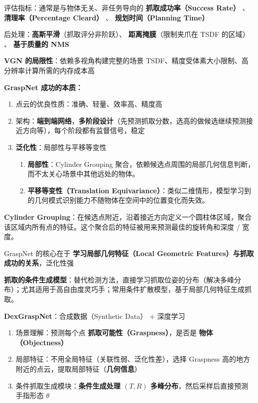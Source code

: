 \documentclass[
  8pt]{extarticle}
\providecommand{\tightlist}{%
  \setlength{\itemsep}{0pt}\setlength{\parskip}{0pt}}
\begin{document}
\begin{multicols*}{4}
评估指标：通常是与物体无关、非任务导向的 \textbf{抓取成功率（Success
Rate）} 、 \textbf{清理率（Percentage Cleard）} 、
\textbf{规划时间（Planning Time）}

后处理：\textbf{高斯平滑}（抓取评分非阶跃）、
\textbf{距离掩膜}（限制夹爪在 TSDF 的区域） 、 \textbf{基于质量的 NMS}

\textbf{VGN 的局限性}：依赖多视角构建完整的场景
TSDF、精度受体素大小限制、高分辨率计算所需的内存成本高

\textbf{GraspNet 成功的本质：}

\begin{enumerate}
\def\labelenumi{\arabic{enumi}.}
\tightlist
\item
  点云的优良性质：准确、轻量、效率高、精度高
\item
  架构：\textbf{端到端网络}，\textbf{多阶段设计}（先预测抓取分数，选高的做候选继续预测接近方向等），每个阶段都有监督信号，稳定
\item
  \textbf{泛化性}：局部性与平移等变性

  \begin{enumerate}
  \def\labelenumii{\arabic{enumii}.}
  \tightlist
  \item
    \textbf{局部性}：Cylinder Grouping
    聚合，依赖候选点周围的局部几何信息判断，而不太关心场景中其他远处的物体。
  \item
    \textbf{平移等变性（Translation
    Equivariance）}：类似二维情形，模型学习到的几何模式识别能力不随物体在空间中的位置变化而失效。
  \end{enumerate}
\end{enumerate}

\textbf{Cylinder
Grouping}：在候选点附近，沿着接近方向定义一个圆柱体区域，聚合该区域内所有点的特征。这个聚合后的特征被用来预测最佳的旋转角和深度
/ 宽度。

GraspNet 的核心在于 \textbf{学习局部几何特征（Local Geometric
Features）与抓取成功的关系}，泛化性强

\textbf{抓取的条件生成模型}：替代检测方法，直接学习抓取位姿的分布（解决多峰分布）；尤其适用于高自由度灵巧手；常用条件扩散模型，基于局部几何特征生成抓取。

\textbf{DexGraspNet}：合成数据（Synthetic Data） + 深度学习

\begin{enumerate}
\def\labelenumi{\arabic{enumi}.}
\tightlist
\item
  场景理解：预测每个点 \textbf{抓取可能性（Graspness）}，是否是
  \textbf{物体（Objectness）}
\item
  局部特征：不用全局特征（关联性弱、泛化性差），选择 Graspness
  高的地方附近的点云，提取局部特征（\textbf{几何信息}）
\item
  条件抓取生成模块：\textbf{条件生成处理 \((T, R)\)
  多峰分布}，然后采样后直接预测手指形态 \(\theta\)
\end{enumerate}


\end{multicols*}
\end{document}
